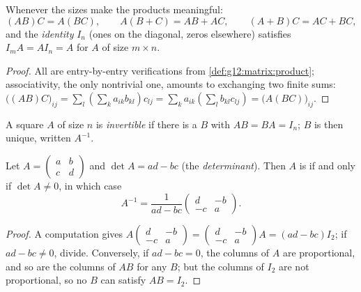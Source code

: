 \begin{proposition}\label{prop:g12:matrix:rules}
Whenever the sizes make the products meaningful:
\[
(AB)C = A(BC), \qquad A(B + C) = AB + AC, \qquad (A+B)C = AC + BC,
\]
and the \emph{identity } $I_n$ (ones on the diagonal, zeros elsewhere)
satisfies $I_m A = A I_n = A$ for $A$ of size $m \times n$.
\end{proposition}

\begin{proof}
All are entry-by-entry verifications from
\cref{def:g12:matrix:product}; associativity, the only nontrivial one,
amounts to exchanging two finite sums:
$\bigl((AB)C\bigr)_{ij} = \sum_l \left(\sum_k a_{ik}b_{kl}\right) c_{lj}
= \sum_k a_{ik} \left(\sum_l b_{kl} c_{lj}\right)
= \bigl(A(BC)\bigr)_{ij}$.
\end{proof}

\begin{definition}[Inverse]\label{def:g12:matrix:inverse}
A square  $A$ of size $n$ is \emph{invertible}
if there is a  $B$ with $AB = BA = I_n$; $B$ is then unique, written
$A^{-1}$.
\end{definition}

\begin{proposition}\label{prop:g12:matrix:inverse2x2}
Let $A = \begin{pmatrix} a & b\\ c & d\end{pmatrix}$ and
$\det A = ad - bc$ (the \emph{determinant}). Then $A$ is
 if and only if $\det A \neq 0$, in which case
\[
A^{-1} = \frac{1}{ad - bc}\begin{pmatrix} d & -b\\ -c & a\end{pmatrix}.
\]
\end{proposition}

\begin{proof}
A computation gives
$A \begin{pmatrix} d & -b\\ -c & a\end{pmatrix}
= \begin{pmatrix} d & -b\\ -c & a\end{pmatrix} A = (ad - bc) I_2$; if
$ad - bc \neq 0$, divide. Conversely, if $ad - bc = 0$, the columns of $A$
are proportional, and so are the columns of $AB$ for any $B$; but the
columns of $I_2$ are not proportional, so no $B$ can satisfy $AB = I_2$.
\end{proof}


